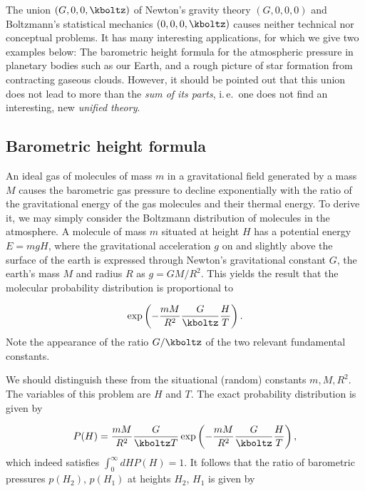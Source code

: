 
\newpage {}
\label{sec:1001}

The union $(G,0,0,\kboltz)$ of Newton's gravity theory $(G,0,0,0)$ and Boltzmann's statistical mechanics $(0,0,0,\kboltz)$ causes neither technical nor conceptual problems. It has many interesting applications, for which we give two examples below: The barometric height formula for the atmospheric pressure in planetary bodies such as our Earth, and a rough picture of star formation from contracting gaseous clouds. However, it should be pointed out that this union does not lead to more than the \emph{sum of its parts}, i.\,e.\ one does not find an interesting, new \emph{unified theory}.


\subsection*{Barometric height formula}

An ideal gas of molecules of mass $m$ in a gravitational field generated by a mass $M$ causes the barometric gas pressure to decline exponentially with the ratio of the gravitational energy of the gas molecules and their thermal energy. To derive it, we may simply consider the Boltzmann distribution of molecules in the atmosphere. A molecule of mass $m$ situated at height $H$ has a potential energy $E=m g H$, where the gravitational acceleration $g$ on and slightly above the surface of the earth is expressed through Newton's gravitational constant $G$, the earth's mass $M$ and radius $R$ as $g=G M/R^2$. This yields the result that the molecular probability distribution is proportional to 

\begin{equation*}\label{eq:barometric_height}
  \exp\left(-\frac{m M}{R^2}\frac{G}{\kboltz} \frac{H}{T}\right).
\end{equation*}
%
Note the appearance of the ratio $G/\kboltz$ of the two relevant fundamental constants.

We should distinguish these from the situational (random) constants $m, M, R^2$. The variables of this problem are $H$ and $T$. The exact probability distribution is given by

\begin{equation*}\label{eq:barometric_height_full_1}
  P(H)=\frac{m M}{R^2}\frac{G}{\kboltz T} \exp\left(-\frac{m M}{R^2}\frac{G}{\kboltz} \frac{H}{T}\right),
\end{equation*} 
%
which indeed satisfies $\int_0^\infty dH P(H)=1$. It follows that the ratio of barometric pressures $p(H_2)$, $p(H_1)$ at heights $H_2$, $H_1$ is given by

